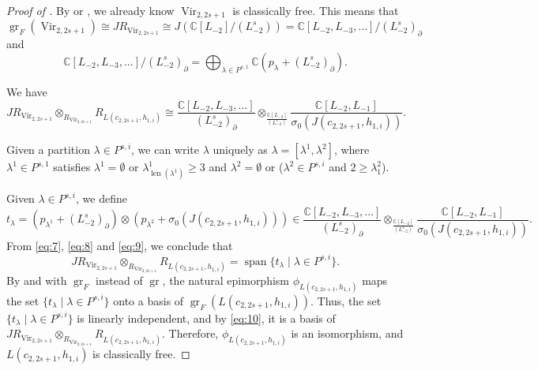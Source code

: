 \documentclass[a4paper, 12pt, reqno]{amsart}
\theoremstyle{remark}
\DeclareMathOperator{\Vir}{Vir}
\DeclareMathOperator{\len}{len}
\DeclareMathOperator{\gr}{gr}
\DeclareMathOperator{\vspan}{span}
\begin{document}
\begin{proof}[Proof of ]
  By \cite{van_ekeren_chiral_2021} or \cite{bruschek_arc_2013}, we already know $\Vir_{2, 2s + 1}$ is classically free.
  This means that $\gr_F(\Vir_{2, 2s + 1}) \cong JR_{\Vir_{2, 2s + 1}} \cong J(\mathbb{C}[L_{-2}]/(L_{-2}^s)) = \mathbb{C}[L_{-2}, L_{-3}, \dots]/(L_{-2}^s)_{\partial}$ and
  \begin{equation}
    \label{eq:8}
    \mathbb{C}[L_{-2}, L_{-3}, \dots]/(L_{-2}^s)_{\partial} = \bigoplus_{\lambda \in P^{s, 1}}\mathbb{C}(p_{\lambda} + (L_{-2}^s)_{\partial}).
  \end{equation}

  We have
  \begin{equation}
    \label{eq:9}
    JR_{\Vir_{2, 2s + 1}} \otimes_{R_{\Vir_{2, 2s + 1}}} R_{L(c_{2, 2s + 1}, h_{1, i})} \cong \frac{\mathbb{C}[L_{-2}, L_{-3}, \dots]}{(L_{-2}^s)_{\partial}} \otimes_{\frac{\mathbb{C}[L_{-2}]}{(L_{-2}^s)}}\frac{\mathbb{C}[L_{-2}, L_{-1}]}{\sigma_0(J(c_{2, 2s + 1}, h_{1, i}))}.
  \end{equation}

  Given a partition $\lambda \in P^{s, i}$, we can write $\lambda$ uniquely as $\lambda = [\lambda^1, \lambda^2]$, where $\lambda^1 \in P^{s, 1}$ satisfies $\lambda^1 = \emptyset$ or $\lambda^1_{\len(\lambda^1)} \ge 3$ and $\lambda^2 = \emptyset$ or ($\lambda^2 \in P^{s, i}$ and $2 \ge \lambda^2_1$).

  Given $\lambda \in P^{s, i}$, we define
  \begin{equation*}
    t_{\lambda} = (p_{\lambda^1} + (L_{-2}^s)_{\partial})\otimes(p_{\lambda^2} + \sigma_0(J(c_{2, 2s + 1}, h_{1, i}))) \in \frac{\mathbb{C}[L_{-2}, L_{-3}, \dots]}{(L_{-2}^s)_{\partial}} \otimes_{\frac{\mathbb{C}[L_{-2}]}{(L_{-2}^s)}} \frac{\mathbb{C}[L_{-2}, L_{-1}]}{\sigma_0(J(c_{2, 2s + 1}, h_{1, i}))}.
  \end{equation*}
  From \eqref{eq:7}, \eqref{eq:8} and \eqref{eq:9}, we conclude that
  \begin{equation}
    \label{eq:10}
    JR_{\Vir_{2, 2s + 1}} \otimes_{R_{\Vir_{2, 2s + 1}}} R_{L(c_{2, 2s + 1}, h_{1, i})} = \vspan\{t_{\lambda} \mid \lambda \in P^{s, i}\}.
  \end{equation}
  By  and  with $\gr_F$ instead of $\gr$, the natural epimorphism $\phi_{L(c_{2, 2s + 1}, h_{1, i})}$ maps the set $\{t_{\lambda} \mid \lambda \in P^{s, i}\}$ onto a basis of $\gr_F(L(c_{2, 2s + 1}, h_{1, i}))$.
  Thus, the set $\{t_{\lambda} \mid \lambda \in P^{s, i}\}$ is linearly independent, and by \eqref{eq:10}, it is a basis of $JR_{\Vir_{2, 2s + 1}} \otimes_{R_{\Vir_{2, 2s + 1}}} R_{L(c_{2, 2s + 1}, h_{1, i})}$.
  Therefore, $\phi_{L(c_{2, 2s + 1}, h_{1, i})}$ is an isomorphism, and $L(c_{2, 2s + 1}, h_{1, i})$ is classically free.


\end{proof}
\end{document}
